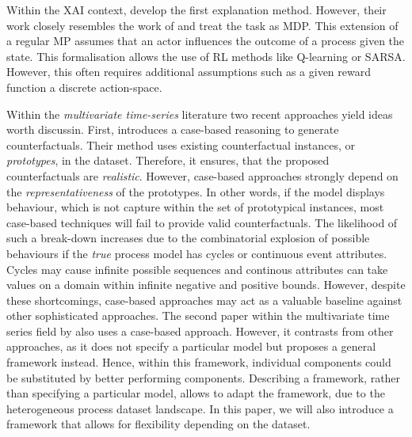 \documentclass[12pt,a4paper]{report}
\begin{document}
Within the \gls{XAI} context, \citeauthor{tsirtsis_CounterfactualExplanationsSequential_2021} develop the first explanation method. However, their work closely resembles the work of \citeauthor{oberst_CounterfactualOffPolicyEvaluation_2019} and treat the task as \gls{MDP}. This extension of a regular \gls{MP} assumes that an actor influences the outcome of a process given the state. This formalisation allows the use of \gls{RL} methods like Q-learning or SARSA\needscite. However, this often requires additional assumptions such as a given reward function a discrete action-space.  

Within the \emph{multivariate time-series} literature two recent approaches yield ideas worth discussin. First, \citeauthor{delaney_InstanceBasedCounterfactualExplanations_2021} introduces a case-based reasoning to generate counterfactuals. Their method uses existing counterfactual instances, or \emph{prototypes}, in the dataset. Therefore, it ensures, that the proposed counterfactuals are \emph{realistic}. However, case-based approaches strongly depend on the \emph{representativeness} of the prototypes\needscite. In other words, if the model displays behaviour, which is not capture within the set of prototypical instances, most case-based techniques will fail to provide valid counterfactuals. The likelihood of such a break-down increases due to the combinatorial explosion of possible behaviours if the \emph{true} process model has cycles or continuous event attributes. Cycles may cause infinite possible sequences and continous attributes can take values on a domain within infinite negative and positive bounds. However, despite these shortcomings, case-based approaches may act as a valuable baseline against other sophisticated approaches. 
The second paper within the multivariate time series field by \citeauthor{ates_CounterfactualExplanationsMultivariate_2021} also uses a case-based approach. However, it contrasts from other approaches, as it does not specify a particular model but proposes a general framework instead. Hence, within this framework, individual components could be substituted by better performing components. Describing a framework, rather than specifying a particular model, allows to adapt the framework, due to the heterogeneous process dataset landscape. In this paper, we will also introduce a framework that allows for flexibility depending on the dataset.  
\end{document}
